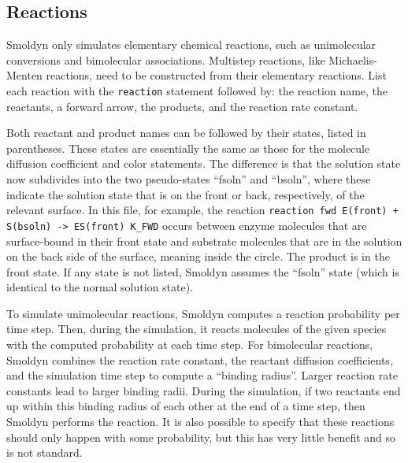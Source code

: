 \documentclass {book}
\newcommand {\ttt} {\texttt}
\begin{document}
\subsection*{Reactions}

Smoldyn only simulates elementary chemical reactions, such as unimolecular conversions and bimolecular associations. Multistep reactions, like Michaelis-Menten reactions, need to be constructed from their elementary reactions. List each reaction with the  \ttt{reaction} statement followed by: the reaction name, the reactants, a forward arrow, the products, and the reaction rate constant.

Both reactant and product names can be followed by their states, listed in parentheses. These states are essentially the same as those for the molecule diffusion coefficient and color statements. The difference is that the solution state now subdivides into the two pseudo-states ``fsoln'' and ``bsoln'', where these indicate the solution state that is on the front or back, respectively, of the relevant surface. In this file, for example, the reaction  \ttt{reaction fwd E(front) + S(bsoln) -> ES(front) K\_FWD} occurs between enzyme molecules that are surface-bound in their front state and substrate molecules that are in the solution on the back side of the surface, meaning inside the circle. The product is in the front state. If any state is not listed, Smoldyn assumes the ``fsoln'' state (which is identical to the normal solution state).

To simulate unimolecular reactions, Smoldyn computes a reaction probability per time step. Then, during the simulation, it reacts molecules of the given species with the computed probability at each time step. For bimolecular reactions, Smoldyn combines the reaction rate constant, the reactant diffusion coefficients, and the simulation time step to compute a ``binding radius''. Larger reaction rate constants lead to larger binding radii. During the simulation, if two reactants end up within this binding radius of each other at the end of a time step, then Smoldyn performs the reaction. It is also possible to specify that these reactions should only happen with some probability, but this has very little benefit and so is not standard.
\end{document}
